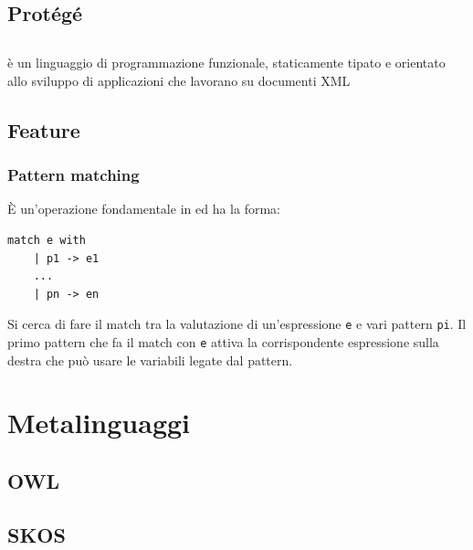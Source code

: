 \subsection{Protégé}

\subsection{\cduce}
\cduce è un linguaggio di programmazione funzionale, staticamente tipato e orientato allo sviluppo di applicazioni che lavorano su documenti XML\cite{cduceLanguage}
\subsection{Feature}\label{fature_cduce}
\subsubsection{Pattern matching}
\label{CDucePattern}
È un'operazione fondamentale in \cduce ed ha la forma:
\begin{verbatim}
match e with
	| p1 -> e1
	...
	| pn -> en
\end{verbatim}
Si cerca di fare il match tra la valutazione di un'espressione \verb|e| e vari pattern \verb|pi|. Il primo pattern che fa il match con \verb|e| attiva la corrispondente espressione sulla destra che può usare le variabili legate dal pattern.


\section{Metalinguaggi}

\subsection{OWL}

\subsection{SKOS}
